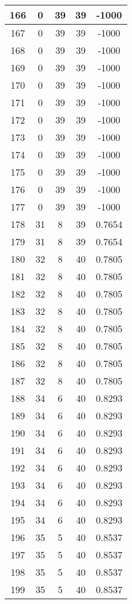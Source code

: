 \documentclass[letterpaper, 12pt]{article}
\begin{document}
\begin{longtable}{|c|c|c|c|c|}
\hline
166 & 0 & 39 & 39 & -1000 \\
\hline
167 & 0 & 39 & 39 & -1000 \\
\hline
168 & 0 & 39 & 39 & -1000 \\
\hline
169 & 0 & 39 & 39 & -1000 \\
\hline
170 & 0 & 39 & 39 & -1000 \\
\hline
171 & 0 & 39 & 39 & -1000 \\
\hline
172 & 0 & 39 & 39 & -1000 \\
\hline
173 & 0 & 39 & 39 & -1000 \\
\hline
174 & 0 & 39 & 39 & -1000 \\
\hline
175 & 0 & 39 & 39 & -1000 \\
\hline
176 & 0 & 39 & 39 & -1000 \\
\hline
177 & 0 & 39 & 39 & -1000 \\
\hline
178 & 31 & 8 & 39 & 0.7654 \\
\hline
179 & 31 & 8 & 39 & 0.7654 \\
\hline
180 & 32 & 8 & 40 & 0.7805 \\
\hline
181 & 32 & 8 & 40 & 0.7805 \\
\hline
182 & 32 & 8 & 40 & 0.7805 \\
\hline
183 & 32 & 8 & 40 & 0.7805 \\
\hline
184 & 32 & 8 & 40 & 0.7805 \\
\hline
185 & 32 & 8 & 40 & 0.7805 \\
\hline
186 & 32 & 8 & 40 & 0.7805 \\
\hline
187 & 32 & 8 & 40 & 0.7805 \\
\hline
188 & 34 & 6 & 40 & 0.8293 \\
\hline
189 & 34 & 6 & 40 & 0.8293 \\
\hline
190 & 34 & 6 & 40 & 0.8293 \\
\hline
191 & 34 & 6 & 40 & 0.8293 \\
\hline
192 & 34 & 6 & 40 & 0.8293 \\
\hline
193 & 34 & 6 & 40 & 0.8293 \\
\hline
194 & 34 & 6 & 40 & 0.8293 \\
\hline
195 & 34 & 6 & 40 & 0.8293 \\
\hline
196 & 35 & 5 & 40 & 0.8537 \\
\hline
197 & 35 & 5 & 40 & 0.8537 \\
\hline
198 & 35 & 5 & 40 & 0.8537 \\
\hline
199 & 35 & 5 & 40 & 0.8537 \\
\hline
\end{longtable}
\end{document}
